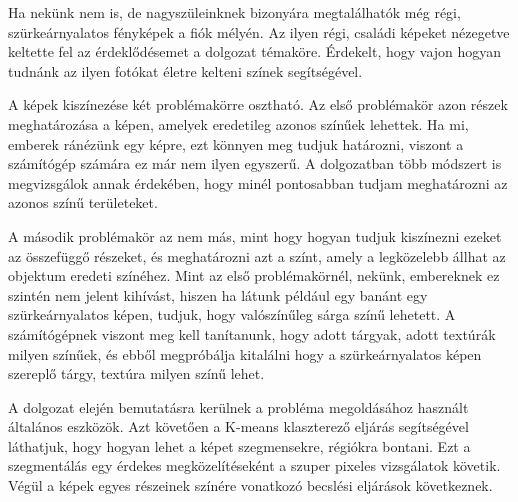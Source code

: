 
Ha nekünk nem is, de nagyszüleinknek bizonyára megtalálhatók még régi, szürkeárnyalatos fényképek a fiók mélyén. Az ilyen régi, családi képeket nézegetve keltette fel az érdeklődésemet a dolgozat témaköre. Érdekelt, hogy vajon hogyan tudnánk az ilyen fotókat életre kelteni színek segítségével.

A képek kiszínezése két problémakörre osztható. 
Az első problémakör azon részek meghatározása a képen, amelyek eredetileg azonos színűek lehettek. Ha mi, emberek ránézünk egy képre, ezt könnyen meg tudjuk határozni, viszont a számítógép számára ez már nem ilyen egyszerű. A dolgozatban több módszert is megvizsgálok annak érdekében, hogy minél pontosabban tudjam meghatározni az azonos színű területeket.

A második problémakör az nem más, mint hogy hogyan tudjuk kiszínezni ezeket az összefüggő részeket, és meghatározni azt a színt, amely a legközelebb állhat az objektum eredeti színéhez. Mint az első problémakörnél, nekünk, embereknek ez szintén nem jelent kihívást, hiszen ha látunk például egy banánt egy szürkeárnyalatos képen, tudjuk, hogy valószínűleg sárga színű lehetett. A számítógépnek viszont meg kell tanítanunk, hogy adott tárgyak, adott textúrák milyen színűek, és ebből megpróbálja kitalálni hogy a szürkeárnyalatos képen szereplő tárgy, textúra milyen színű lehet.

A dolgozat elején bemutatásra kerülnek a probléma megoldásához használt általános eszközök. Azt követően a K-means klaszterező eljárás segítségével láthatjuk, hogy hogyan lehet a képet szegmensekre, régiókra bontani. Ezt a szegmentálás egy érdekes megközelítéseként a szuper pixeles vizsgálatok követik. Végül a képek egyes részeinek színére vonatkozó becslési eljárások következnek.
